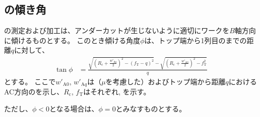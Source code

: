 \subsection{\indexDimpleAngle\nameDimpleMilling の傾き角}
\Dimple の測定および加工は、アンダーカットが生じないように適切にワークを$B$軸方向に傾けるものとする。
このとき\indexDimpleAngle 傾ける角度$\phi$は、トップ端から1列目の\nameDimple までの距離$q$に対して、
\begin{align*}
  \tan\phi
  &= \frac{\displaystyle
           \sqrt{\left(R_\mathrm c+\frac{w'_{\mathrm Aq}}2\right)^2-(f_\mathrm T-q)^2}
           -\sqrt{\left(R_\mathrm c+\frac{w'_{\mathrm A0}}2\right)^2-f_\mathrm T^2}}q
\end{align*}
とする。
ここで$w'_{\mathrm A0}$, $w'_{\mathrm Aq}$は（\PlatingThk$\mu$を考慮した）\TopEndACID およびトップ端から距離$q$におけるAC方向の\InnerDiameter を示し、$R_\mathrm c$, $f_\mathrm T$はそれぞれ\CenterCurvatureRadius, \TopAlocationLength を示す。

ただし、$\phi < 0$となる場合は、$\phi = 0$とみなすものとする。
